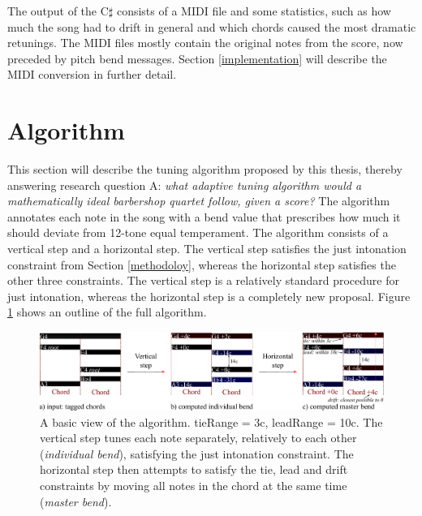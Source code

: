 \documentclass[a4paper]{article}
\begin{document}
The output of the C$\sharp$ consists of a MIDI file \cite{midi_manufacturers_association_complete_2014} and some statistics, such as how much the song had to drift in general and which chords caused the most dramatic retunings. The MIDI files mostly contain the original notes from the score, now preceded by pitch bend messages. Section \ref{implementation} will describe the MIDI conversion in further detail.


\section{Algorithm}
\label{algorithm}
This section will describe the tuning algorithm proposed by this thesis, thereby answering research question A: {\it what adaptive tuning algorithm would a mathematically ideal barbershop quartet follow, given a score?} The algorithm annotates each note in the song with a bend value that prescribes how much it should deviate from 12-tone equal temperament. The algorithm consists of a vertical step and a horizontal step. The vertical step satisfies the just intonation constraint from Section \ref{methodoloy}, whereas the horizontal step satisfies the other three constraints. The vertical step is a relatively standard procedure for just intonation, whereas the horizontal step is a completely new proposal. Figure \ref{fig:algo_outline} shows an outline of the full algorithm.

\begin{figure}
	\includegraphics[width=\linewidth]{Figures/algo_outline.pdf}
	\caption{A basic view of the algorithm. tieRange = 3c, leadRange = 10c. The vertical step tunes each note separately, relatively to each other (\textit{individual bend}), satisfying the just intonation constraint. The horizontal step then attempts to satisfy the tie, lead and drift constraints by moving all notes in the chord at the same time (\textit{master bend}).}
	\label{fig:algo_outline}
\end{figure}
\end{document}
